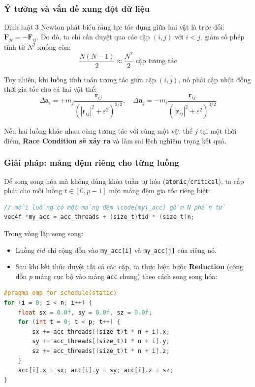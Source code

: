 \subsubsection{Ý tưởng và vấn đề xung đột dữ liệu}
Định luật 3 Newton phát biểu rằng lực tác dụng giữa hai vật là trực đối: $\mathbf{F}_{ji} = -\mathbf{F}_{ij}$. Do đó, ta chỉ cần duyệt qua các cặp $(i, j)$ với $i < j$, giảm số phép tính từ $N^2$ xuống còn:
\[ \frac{N(N-1)}{2} \approx \frac{N^2}{2} \text{ cặp tương tác} \]

Tuy nhiên, khi luồng tính toán tương tác giữa cặp $(i, j)$, nó phải cập nhật đồng thời gia tốc cho cả hai vật thể:
\[ \Delta \mathbf{a}_i = + m_j \frac{\mathbf{r}_{ij}}{\left(|\mathbf{r}_{ij}|^2 + \varepsilon^2\right)^{3/2}}, \quad \Delta \mathbf{a}_j = - m_i \frac{\mathbf{r}_{ij}}{\left(|\mathbf{r}_{ij}|^2 + \varepsilon^2\right)^{3/2}} \]

Nếu hai luồng khác nhau cùng tương tác với cùng một vật thể $j$ tại một thời điểm, \textbf{Race Condition sẽ xảy ra} và làm sai lệch nghiêm trọng kết quả.

\subsubsection{Giải pháp: mảng đệm riêng cho từng luồng}
Để song song hóa mà không dùng khóa tuần tự hóa (\texttt{atomic}/\texttt{critical}), ta cấp phát cho mỗi luồng $t \in [0, p-1]$ một mảng đệm gia tốc riêng biệt:
\begin{lstlisting}[language=C]
// mỗi luồng có một mảng đệm \code{my\_acc} gồm N phần tử
vec4f *my_acc = acc_threads + (size_t)tid * (size_t)n;
\end{lstlisting}
Trong vòng lặp song song:
\begin{itemize}
\item Luồng $tid$ chỉ cộng dồn vào \texttt{my\_acc[i]} và \texttt{my\_acc[j]} của riêng nó.
\item Sau khi kết thúc duyệt tất cả các cặp, ta thực hiện bước \textbf{Reduction} (cộng dồn $p$ mảng cục bộ vào mảng \texttt{acc} chung) theo cách song song hóa:
\end{itemize}
\begin{lstlisting}[language=C]
#pragma omp for schedule(static)
for (i = 0; i < n; i++) {
    float sx = 0.0f, sy = 0.0f, sz = 0.0f;
    for (int t = 0; t < p; t++) {
        sx += acc_threads[(size_t)t * n + i].x;
        sy += acc_threads[(size_t)t * n + i].y;
        sz += acc_threads[(size_t)t * n + i].z;
    }
    acc[i].x = sx; acc[i].y = sy; acc[i].z = sz;
}
\end{lstlisting}

